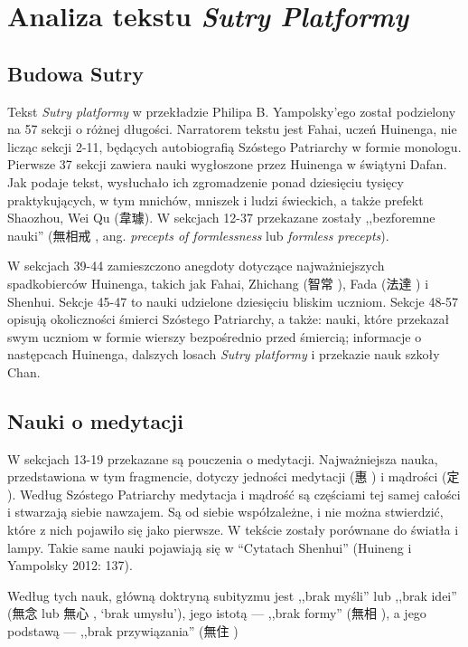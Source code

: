 \chapter{Analiza tekstu \textit{Sutry Platformy}}

\section{Budowa Sutry}
Tekst \textit{Sutry platformy} w przekładzie Philipa B. Yampolsky'ego został podzielony na 57 sekcji o różnej długości. Narratorem tekstu jest Fahai, uczeń Huinenga, nie licząc sekcji 2-11, będących autobiografią Szóstego Patriarchy w formie monologu. Pierwsze 37 sekcji zawiera nauki wygłoszone przez Huinenga w świątyni Dafan. Jak podaje tekst, wysłuchało ich zgromadzenie ponad dziesięciu tysięcy praktykujących, w tym mnichów, mniszek i ludzi świeckich, a także prefekt Shaozhou, Wei Qu (韋璩). W sekcjach 12-37 przekazane zostały ,,bezforemne nauki'' (無相戒 , ang. \textit{precepts of formlessness} lub \textit{formless precepts}).

W sekcjach 39-44 zamieszczono anegdoty dotyczące najważniejszych spadkobierców Huinenga, takich jak Fahai, Zhichang (智常 ), Fada (法達 ) i Shenhui. Sekcje 45-47 to nauki udzielone dziesięciu bliskim uczniom. Sekcje 48-57 opisują okoliczności śmierci Szóstego Patriarchy, a także: nauki, które przekazał swym uczniom w formie wierszy bezpośrednio przed śmiercią; informacje o następcach Huinenga, dalszych losach \textit{Sutry platformy} i przekazie nauk szkoły Chan.

\section{Nauki o medytacji}
W sekcjach 13-19 przekazane są pouczenia o medytacji. Najważniejsza nauka, przedstawiona w tym fragmencie, dotyczy jedności medytacji (惠 ) i mądrości (定 ).\label{DingHui}
Według Szóstego Patriarchy medytacja i mądrość są częściami tej samej całości i stwarzają siebie nawzajem.
Są od siebie współzależne, i nie można stwierdzić, które z nich pojawiło się jako pierwsze. W tekście zostały porównane do światła i lampy. Takie same nauki pojawiają się w ``Cytatach Shenhui''
(Huineng i Yampolsky 2012: 137).

Według tych nauk, główną doktryną subityzmu jest ,,brak myśli'' lub ,,brak idei'' (無念  lub 無心 , `brak umysłu'), jego istotą --- ,,brak formy'' (無相 ), a jego podstawą --- ,,brak przywiązania'' (無住 )\ibid

